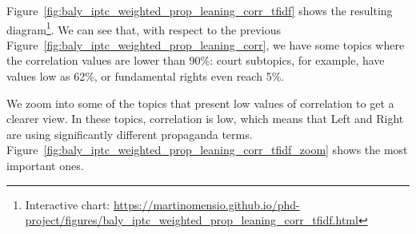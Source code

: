 Figure~\ref{fig:baly_iptc_weighted_prop_leaning_corr_tfidf} shows the resulting diagram\footnote{Interactive chart: \url{https://martinomensio.github.io/phd-project/figures/baly_iptc_weighted_prop_leaning_corr_tfidf.html}}. We can see that, with respect to the previous Figure~\ref{fig:baly_iptc_weighted_prop_leaning_corr}, we have some topics where the correlation values are lower than 90\%: court subtopics, for example, have values low as 62\%, or fundamental rights even reach 5\%.

We zoom into some of the topics that present low values of correlation to get a clearer view. In these topics, correlation is low, which means that Left and Right are using significantly different propaganda terms. Figure~\ref{fig:baly_iptc_weighted_prop_leaning_corr_tfidf_zoom} shows the most important ones.

